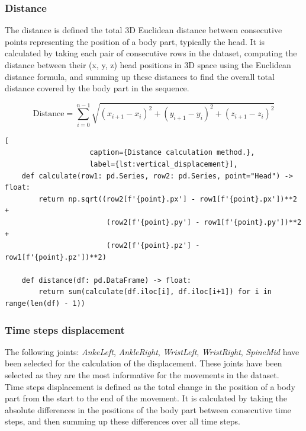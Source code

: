             \subsubsection{Distance}

                The distance is defined the total 3D Euclidean distance between consecutive points representing the position of a body part, typically the head. It is calculated by taking each pair of consecutive rows in the dataset, computing the distance between their (x, y, z) head positions in 3D space using the Euclidean distance formula, and summing  up these distances to find the overall total distance covered by the body part in the sequence.

                \begin{equation}
                    \text{Distance} = \sum_{i=0}^{n-1} \sqrt{(x_{i+1} - x_i)^2 + (y_{i+1} - y_i)^2 + (z_{i+1} - z_i)^2}
                \end{equation}

                \begin{lstlisting}[
                    caption={Distance calculation method.}, 
                    label={lst:vertical_displacement}],     
    def calculate(row1: pd.Series, row2: pd.Series, point="Head") -> float:
        return np.sqrt((row2[f'{point}.px'] - row1[f'{point}.px'])**2 +
                        (row2[f'{point}.py'] - row1[f'{point}.py'])**2 +
                        (row2[f'{point}.pz'] - row1[f'{point}.pz'])**2)
    
    def distance(df: pd.DataFrame) -> float:
        return sum(calculate(df.iloc[i], df.iloc[i+1]) for i in range(len(df) - 1))
                \end{lstlisting}
            \subsubsection{Time steps displacement}
                The following joints: \textit{AnkeLeft}, \textit{AnkleRight}, \textit{WristLeft}, \textit{WristRight}, \textit{SpineMid} have been selected for the calculation of the displacement. These joints have been selected as they are the most informative for the movements in the dataset. \\

                Time steps displacement is defined as the total change in the position of a body part from the start to the end of the movement. It is calculated by taking the absolute differences in the positions of the body part between consecutive time steps, and then summing up these differences over all time steps.

